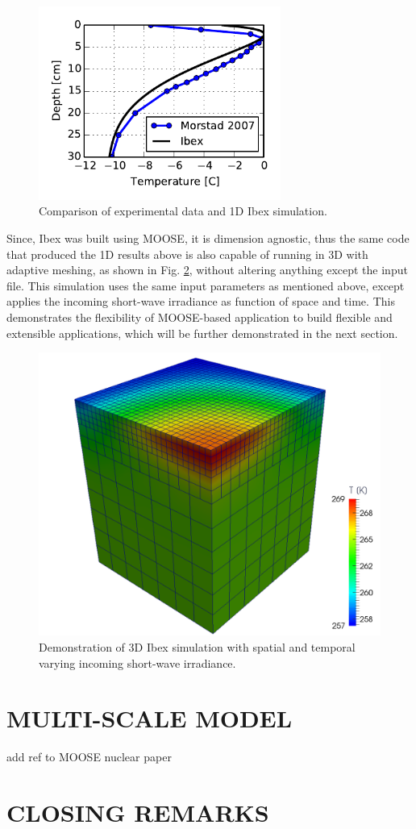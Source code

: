 \begin{figure}[h]
  \includegraphics[width=3.125in]{figures/ibex.pdf}
  \caption{Comparison of experimental data and 1D Ibex simulation.}
  \label{fig:ibex_1d}
\end{figure}

Since, Ibex was built using MOOSE, it is dimension agnostic, thus the same code that produced the 1D results above is also capable of running in 3D with adaptive meshing, as shown in Fig. \ref{fig:ibex_3d}, without altering anything except the input file. This simulation uses the same input parameters as mentioned above, except applies the incoming short-wave irradiance as function of space and time. This demonstrates the flexibility of MOOSE-based application to build flexible and extensible applications, which will be further demonstrated in the next section.

\begin{figure}
  \includegraphics[width=\linewidth]{figures/ibex3d.pdf}
  \caption{Demonstration of 3D Ibex simulation with spatial and temporal varying incoming short-wave irradiance.}
  \label{fig:ibex_3d}
\end{figure}


\section{MULTI-SCALE MODEL}\label{sec:yeti}
add ref to MOOSE nuclear paper

\section{CLOSING REMARKS}
